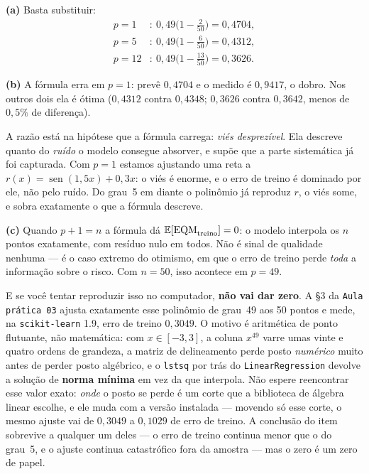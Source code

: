 \documentclass[11pt,a4paper]{article}
\begin{document}
\begin{solucao}
\textbf{(a)} Basta substituir:
\[
\begin{aligned}
  p=1&:\ 0{,}49\Big(1-\tfrac{2}{50}\Big)=0{,}4704,\\
  p=5&:\ 0{,}49\Big(1-\tfrac{6}{50}\Big)=0{,}4312,\\
  p=12&:\ 0{,}49\Big(1-\tfrac{13}{50}\Big)=0{,}3626.
\end{aligned}
\]

\smallskip
\textbf{(b)} A fórmula erra em \textbf{$p=1$}: prevê $0{,}4704$ e o medido é
$0{,}9417$, o dobro. Nos outros dois ela é ótima ($0{,}4312$ contra $0{,}4348$;
$0{,}3626$ contra $0{,}3642$, menos de $0{,}5\%$ de diferença).

A razão está na hipótese que a fórmula carrega: \emph{viés desprezível}. Ela
descreve quanto do \emph{ruído} o modelo consegue absorver, e supõe que a parte
sistemática já foi capturada. Com $p=1$ estamos ajustando uma reta a
$r(x)=\operatorname{sen}(1{,}5x)+0{,}3x$: o viés é enorme, e o erro de treino é
dominado por ele, não pelo ruído. Do grau~5 em diante o polinômio já reproduz
$r$, o viés some, e sobra exatamente o que a fórmula descreve.

\smallskip
\textbf{(c)} Quando $p+1=n$ a fórmula dá $\mathbb{E}[\mathrm{EQM}_{\text{treino}}]=0$: o
modelo interpola os $n$ pontos exatamente, com resíduo nulo em todos. Não é sinal
de qualidade nenhuma --- é o caso extremo do otimismo, em que o erro de treino
perde \emph{toda} a informação sobre o risco. Com $n=50$, isso acontece em $p=49$.

E se você tentar reproduzir isso no computador, \textbf{não vai dar zero}. A §3 da
\texttt{Aula prática 03} ajusta exatamente esse polinômio de grau~49 aos 50 pontos
e mede, na \texttt{scikit-learn} 1.9, erro de treino $0{,}3049$. O motivo é aritmética de ponto flutuante, não
matemática: com $x\in[-3,3]$, a coluna $x^{49}$ varre umas vinte e quatro ordens
de grandeza, a matriz de delineamento perde posto \emph{numérico} muito antes de
perder posto algébrico, e o \texttt{lstsq} por trás do \texttt{LinearRegression}
devolve a solução de \textbf{norma mínima} em vez da que interpola. Não espere
reencontrar esse valor exato: \emph{onde} o posto se perde é um corte que a
biblioteca de álgebra linear escolhe, e ele muda com a versão instalada --- movendo
só esse corte, o mesmo ajuste vai de $0{,}3049$ a $0{,}1029$ de erro de treino. A
conclusão do item sobrevive a qualquer um deles --- o erro de treino continua menor
que o do grau~5, e o ajuste continua catastrófico fora da amostra --- mas o zero é
um zero de papel.


\end{solucao}
\end{document}
